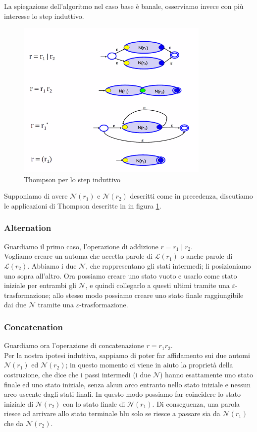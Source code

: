 \documentclass[class=book, crop=false, oneside, 12pt]{standalone}
\begin{document}
\noindent La spiegazione dell'algoritmo nel caso base è banale, osserviamo invece con più interesse lo step induttivo.

\begin{figure}
    \centering
    \includegraphics[width=.7\textwidth,keepaspectratio]{Thompson_step}
    \caption{Thompson per lo step induttivo}
    \label{Thompson_step}
\end{figure}
Supponiamo di avere \(\mathcal{N}(r_1)\) e \(\mathcal{N}(r_2)\) descritti come in precedenza, discutiamo le applicazioni di Thompson descritte in in figura \ref{Thompson_step}.

\subsubsection{Alternation}
Guardiamo il primo caso, l'operazione di addizione \(r = r_1 \mid r_2\).\\
Vogliamo creare un automa che accetta parole di \(\mathcal{L}(r_1)\) o anche parole di \(\mathcal{L}(r_2)\).
Abbiamo i due \(\mathcal{N}\), che rappresentano gli stati intermedi; li posizioniamo uno sopra all’altro. Ora possiamo creare uno stato vuoto e usarlo come stato iniziale per entrambi gli \(\mathcal{N}\), e quindi collegarlo a questi ultimi tramite una \(\varepsilon\)-trasformazione; allo stesso modo possiamo creare uno stato finale raggiungibile dai due \(\mathcal{N}\) tramite una \(\varepsilon\)-trasformazione.

\subsubsection{Concatenation}
Guardiamo ora l’operazione di concatenazione \(r = r_1 r_2\).\\
Per la nostra ipotesi induttiva, sappiamo di poter far affidamento sui due automi \(\mathcal{N}(r_1)\) ed \(\mathcal{N}(r_2)\); in questo momento ci viene in aiuto la proprietà della costruzione, che dice che i passi intermedi (i due \(\mathcal{N}\)) hanno esattamente uno stato finale ed uno stato iniziale, senza alcun arco entranto nello stato iniziale e nessun arco uscente dagli stati finali. 
In questo modo possiamo far coincidere lo stato iniziale di \(\mathcal{N}(r_2)\) con lo stato finale di \(\mathcal{N}(r_1)\). 
Di conseguenza, una parola riesce ad arrivare allo stato terminale blu solo se riesce a passare sia da \(\mathcal{N}(r_1)\) che da \(\mathcal{N}(r_2)\).
\end{document}
